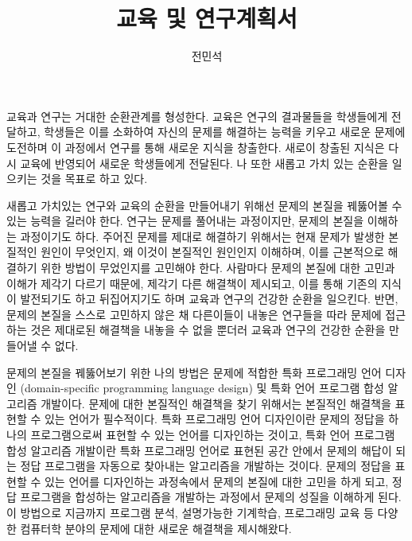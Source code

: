 \documentclass[11pt]{article}
\begin{document}
\title{교육 및 연구계획서}

\author{전민석}



\newcommand{\DisjunctiveModel}{\textsc{Disjunctive Model}}
\newcommand{\FeatureLanguage}{\textsc{Feature Language}}
\newcommand{\GDL}{\textsc{Graph Description Language}}
\newcommand{\PLXGL}{\textsc{PL4XGL}}


\newcommand{\AbstractRelativeWritePattern}{\textsc{Abstract Relative Write Pattern}}





\maketitle 
\begin{spacing}{1.145}

교육과 연구는 거대한 순환관계를 형성한다. 
%
교육은 연구의 결과물들을 학생들에게 전달하고, 학생들은 이를 소화하여 자신의 문제를 해결하는 능력을 키우고 새로운 문제에 도전하며 이 과정에서 연구를 통해 새로운 지식을 창출한다. 새로이 창출된 지식은 다시 교육에 반영되어 새로운 학생들에게 전달된다.
%
나 또한 새롭고 가치 있는 순환을 일으키는 것을 목표로 하고 있다.



새롭고 가치있는 연구와 교육의 순환을 만들어내기 위해선 문제의 본질을 꿰뚫어볼 수 있는 능력을 길러야 한다.
%
연구는 문제를 풀어내는 과정이지만, 문제의 본질을 이해하는 과정이기도 하다. 
%
주어진 문제를 제대로 해결하기 위해서는 현재 문제가 발생한 본질적인 원인이 무엇인지, 왜 이것이 본질적인 원인인지 이해하며, 이를 근본적으로 해결하기 위한 방법이 무었인지를 고민해야 한다.
%
사람마다 문제의 본질에 대한 고민과 이해가 제각기 다르기 때문에, 제각기 다른 해결책이 제시되고, 이를 통해 기존의 지식이 발전되기도 하고 뒤집어지기도 하며 교육과 연구의 건강한 순환을 일으킨다.
%
반면, 문제의 본질을 스스로 고민하지 않은 채 다른이들이 내놓은 연구들을 따라 문제에 접근하는 것은 제대로된 해결책을 내놓을 수 없을 뿐더러 교육과 연구의 건강한 순환을 만들어낼 수 없다.



문제의 본질을 꿰뚫어보기 위한 나의 방법은 문제에 적합한 특화 프로그래밍 언어 디자인 (domain-specific programming language design) 및 특화 언어 프로그램 합성 알고리즘 개발이다.
% 
문제에 대한 본질적인 해결책을 찾기 위해서는 본질적인 해결책을 표현할 수 있는 언어가 필수적이다.
% 
특화 프로그래밍 언어 디자인이란 문제의 정답을 하나의 프로그램으로써 표현할 수 있는 언어를 디자인하는 것이고, 특화 언어 프로그램 합성 알고리즘 개발이란 특화 프로그래밍 언어로 표현된 공간 안에서 문제의 해답이 되는 정답 프로그램을 자동으로 찾아내는 알고리즘을 개발하는 것이다.
% 
문제의 정답을 표현할 수 있는 언어를 디자인하는 과정속에서 문제의 본질에 대한 고민을 하게 되고, 정답 프로그램을 합성하는 알고리즘을 개발하는 과정에서 문제의 성질을 이해하게 된다.
%
이 방법으로 지금까지 프로그램 분석, 설명가능한 기계학습, 프로그래밍 교육 등 다양한 컴퓨터학 분야의 문제에 대한 새로운 해결책을 제시해왔다.











\end{spacing}
\end{document}
